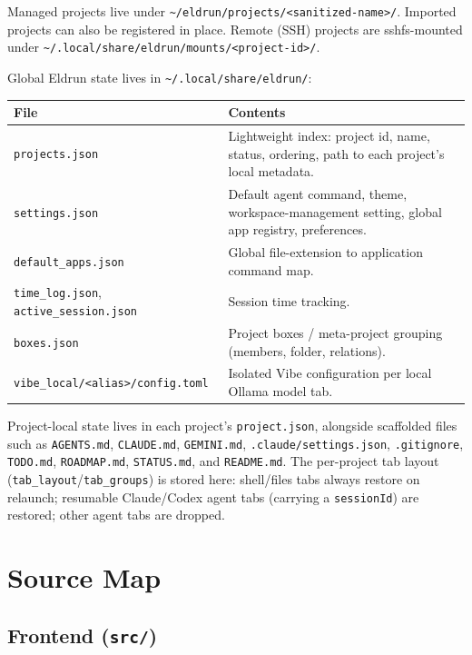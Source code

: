 \documentclass[11pt,a4paper]{article}
\newcommand{\code}[1]{\texttt{#1}}
\begin{document}
Managed projects live under
\code{\textasciitilde/eldrun/projects/<sanitized-name>/}. Imported projects can
also be registered in place. Remote (SSH) projects are sshfs-mounted under
\code{\textasciitilde/.local/share/eldrun/mounts/<project-id>/}.

\noindent Global Eldrun state lives in
\code{\textasciitilde/.local/share/eldrun/}:

\begin{longtable}{@{}p{4.8cm}p{9.8cm}@{}}
\toprule
\textbf{File} & \textbf{Contents} \\
\midrule
\endhead
\code{projects.json}        & Lightweight index: project id, name, status, ordering, path to each project's local metadata. \\
\code{settings.json}        & Default agent command, theme, workspace-management setting, global app registry, preferences. \\
\code{default\_apps.json}   & Global file-extension to application command map. \\
\code{time\_log.json}, \code{active\_session.json} & Session time tracking. \\
\code{boxes.json}           & Project boxes / meta-project grouping (members, folder, relations). \\
\code{vibe\_local/<alias>/config.toml} & Isolated Vibe configuration per local Ollama model tab. \\
\bottomrule
\end{longtable}

Project-local state lives in each project's \code{project.json}, alongside
scaffolded files such as \code{AGENTS.md}, \code{CLAUDE.md}, \code{GEMINI.md},
\code{.claude/settings.json}, \code{.gitignore}, \code{TODO.md},
\code{ROADMAP.md}, \code{STATUS.md}, and \code{README.md}. The per-project tab
layout (\code{tab\_layout}/\code{tab\_groups}) is stored here: shell/files tabs
always restore on relaunch; resumable Claude/Codex agent tabs (carrying a
\code{sessionId}) are restored; other agent tabs are dropped.

\section{Source Map}

\subsection{Frontend (\code{src/})}
\end{document}

